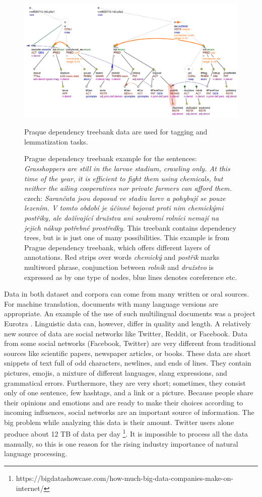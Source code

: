 \begin{figure}
\includegraphics[width=1\textwidth]{../img/prague_dep_treebank.png}
\caption{
Prague dependency treebank example \cite{PDT35} for the sentences:
\textit{Grasshoppers are still in the larvae stadium, crawling only. At this time of the year, it is efficient to fight them using chemicals, but neither the ailing cooperatives nor private farmers can afford them.} czech: \textit{Sarančata jsou doposud ve stadiu larev a pohybují se pouze lezením. V tomto období je účinné bojovat proti nim chemickými postřiky, ale dožívající družstva ani soukromí rolníci nemají na jejich nákup potřebné prostředky}. This treebank contains dependency trees, but is is just one of many possibilities. This example is from Prague dependency treebank, which offers different layers of annotations. Red strips over words \textit{chemický} and \textit{postřik} marks multiword phrase, conjunction between \textit{rolník} and \textit{družstvo} is expressed as by one type of nodes, blue lines denotes coreference etc.} Praque dependency treebank data are used for tagging and lemmatization tasks.
\label{fig:pdt}
\end{figure}

Data in both dataset and corpora can come from many written or oral sources. For machine translation, documents with many language versions are appropriate. An example of the use of such multilingual documents was a project Eurotra \citep{oakley1995final}. Linguistic data can, however,  differ in quality and length.  A relatively new source of data are social networks like Twitter, Reddit, or Facebook. Data from some social networks (Facebook, Twitter) are very different from traditional sources like scientific papers, newspaper articles, or books.  These data are short snippets of text full of odd characters, newlines, and ends of lines. They contain pictures, emojis, a mixture of different languages, slang expressions, and grammatical errors. Furthermore, they are very short; sometimes, they consist only of one sentence, few hashtags, and a link or a picture. Because people share their opinions and emotions and are ready to make their choices according to incoming influences, social networks are an important source of information. The big problem while analyzing this data is their amount. Twitter users alone produce about 12 TB of data per day \footnote{https://bigdatashowcase.com/how-much-big-data-companies-make-on-internet/}. It is impossible to process all the data manually, so this is one reason for the rising industry importance of natural language processing.

